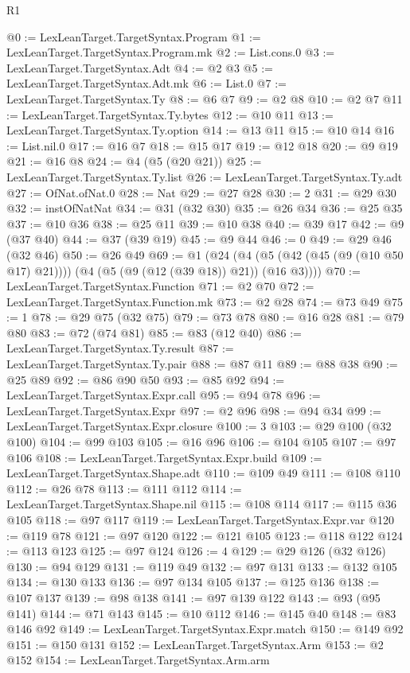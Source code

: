\begin{lexlean}{R1}
\begin{coremodule}
@0 := LexLeanTarget.TargetSyntax.Program
@1 := LexLeanTarget.TargetSyntax.Program.mk
@2 := List.cons.{0}
@3 := LexLeanTarget.TargetSyntax.Adt
@4 := @2 @3
@5 := LexLeanTarget.TargetSyntax.Adt.mk
@6 := List.{0}
@7 := LexLeanTarget.TargetSyntax.Ty
@8 := @6 @7
@9 := @2 @8
@10 := @2 @7
@11 := LexLeanTarget.TargetSyntax.Ty.bytes
@12 := @10 @11
@13 := LexLeanTarget.TargetSyntax.Ty.option
@14 := @13 @11
@15 := @10 @14
@16 := List.nil.{0}
@17 := @16 @7
@18 := @15 @17
@19 := @12 @18
@20 := @9 @19
@21 := @16 @8
@24 := @4 (@5 (@20 @21))
@25 := LexLeanTarget.TargetSyntax.Ty.list
@26 := LexLeanTarget.TargetSyntax.Ty.adt
@27 := OfNat.ofNat.{0}
@28 := Nat
@29 := @27 @28
@30 := 2
@31 := @29 @30
@32 := instOfNatNat
@34 := @31 (@32 @30)
@35 := @26 @34
@36 := @25 @35
@37 := @10 @36
@38 := @25 @11
@39 := @10 @38
@40 := @39 @17
@42 := @9 (@37 @40)
@44 := @37 (@39 @19)
@45 := @9 @44
@46 := 0
@49 := @29 @46 (@32 @46)
@50 := @26 @49
@69 := @1
    (@24 (@4 (@5 (@42 (@45 (@9 (@10 @50 @17) @21)))) (@4 (@5 (@9 (@12 (@39 @18)) @21)) (@16 @3))))
@70 := LexLeanTarget.TargetSyntax.Function
@71 := @2 @70
@72 := LexLeanTarget.TargetSyntax.Function.mk
@73 := @2 @28
@74 := @73 @49
@75 := 1
@78 := @29 @75 (@32 @75)
@79 := @73 @78
@80 := @16 @28
@81 := @79 @80
@83 := @72 (@74 @81)
@85 := @83 (@12 @40)
@86 := LexLeanTarget.TargetSyntax.Ty.result
@87 := LexLeanTarget.TargetSyntax.Ty.pair
@88 := @87 @11
@89 := @88 @38
@90 := @25 @89
@92 := @86 @90 @50
@93 := @85 @92
@94 := LexLeanTarget.TargetSyntax.Expr.call
@95 := @94 @78
@96 := LexLeanTarget.TargetSyntax.Expr
@97 := @2 @96
@98 := @94 @34
@99 := LexLeanTarget.TargetSyntax.Expr.closure
@100 := 3
@103 := @29 @100 (@32 @100)
@104 := @99 @103
@105 := @16 @96
@106 := @104 @105
@107 := @97 @106
@108 := LexLeanTarget.TargetSyntax.Expr.build
@109 := LexLeanTarget.TargetSyntax.Shape.adt
@110 := @109 @49
@111 := @108 @110
@112 := @26 @78
@113 := @111 @112
@114 := LexLeanTarget.TargetSyntax.Shape.nil
@115 := @108 @114
@117 := @115 @36 @105
@118 := @97 @117
@119 := LexLeanTarget.TargetSyntax.Expr.var
@120 := @119 @78
@121 := @97 @120
@122 := @121 @105
@123 := @118 @122
@124 := @113 @123
@125 := @97 @124
@126 := 4
@129 := @29 @126 (@32 @126)
@130 := @94 @129
@131 := @119 @49
@132 := @97 @131
@133 := @132 @105
@134 := @130 @133
@136 := @97 @134 @105
@137 := @125 @136
@138 := @107 @137
@139 := @98 @138
@141 := @97 @139 @122
@143 := @93 (@95 @141)
@144 := @71 @143
@145 := @10 @112
@146 := @145 @40
@148 := @83 @146 @92
@149 := LexLeanTarget.TargetSyntax.Expr.match
@150 := @149 @92
@151 := @150 @131
@152 := LexLeanTarget.TargetSyntax.Arm
@153 := @2 @152
@154 := LexLeanTarget.TargetSyntax.Arm.arm

\end{coremodule}
\end{lexlean}
